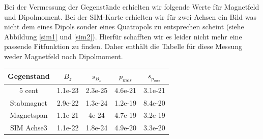 \documentclass[12pt]{article}
\begin{document}
Bei der Vermessung der Gegenstände erhielten wir folgende Werte für Magnetfeld und Dipolmoment. Bei der SIM-Karte erhielten wir für zwei Achsen ein Bild was nicht dem eines Dipols sonder eines Quatropols zu entsprechen scheint (siehe Abbildung \ref{sim1} und \ref{sim2}). Hierfür schafften wir es leider nicht mehr eine passende Fitfunktion zu finden. Daher enthält die Tabelle für diese Messung weder Magnetfeld noch Dipolmoment.

\begin{center}
\begin{tabular}{|c|cc|cc|}
\hline
Gegenstand & $B_z$ & $s_{B_z}$ & $p_{mes}$ & $s_{p_{mes}}$ \\
\hline
5 cent & 1.1e-23 & 2.3e-25 & 4.6e-21 & 3.1e-21 \\
Stabmagnet & 2.9e-22 & 1.3e-24 & 1.2e-19 & 8.4e-20 \\
Magnetspan & 1.1e-21 & 4e-24 & 4.7e-19 & 3.2e-19 \\
SIM Achse3 & 1.1e-22 & 1.8e-24 & 4.9e-20 & 3.3e-20 \\
\hline
\end{tabular}
\end{center}
\end{document}
